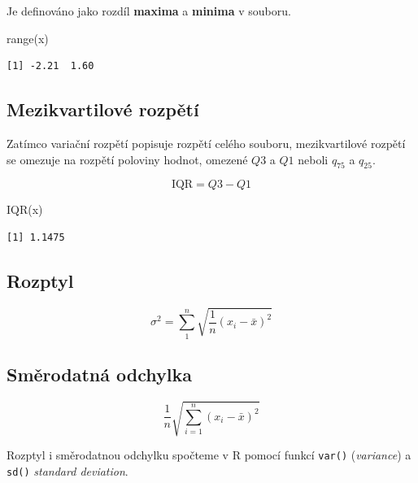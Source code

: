 \documentclass[
  letterpaper,
  DIV=11,
  numbers=noendperiod]{scrreprt}
\newenvironment{Shaded}{\begin{snugshade}}{\end{snugshade}}
\newcommand{\FunctionTok}[1]{\textcolor[rgb]{0.28,0.35,0.67}{#1}}
\newcommand{\NormalTok}[1]{\textcolor[rgb]{0.00,0.23,0.31}{#1}}
\begin{document}
Je definováno jako rozdíl \textbf{maxima} a \textbf{minima} v souboru.

\begin{Shaded}
\begin{Highlighting}[]
\FunctionTok{range}\NormalTok{(x)}
\end{Highlighting}
\end{Shaded}

\begin{verbatim}
[1] -2.21  1.60
\end{verbatim}

\hypertarget{mezikvartilovuxe9-rozpux11btuxed}{%
\subsection{Mezikvartilové
rozpětí}\label{mezikvartilovuxe9-rozpux11btuxed}}

Zatímco variační rozpětí popisuje rozpětí celého souboru, mezikvartilové
rozpětí se omezuje na rozpětí poloviny hodnot, omezené \(Q3\) a \(Q1\)
neboli \(q_{75}\) a \(q_{25}\).

\[
\mathrm{IQR} = Q3 - Q1
\]

\begin{Shaded}
\begin{Highlighting}[]
\FunctionTok{IQR}\NormalTok{(x)}
\end{Highlighting}
\end{Shaded}

\begin{verbatim}
[1] 1.1475
\end{verbatim}

\hypertarget{rozptyl}{%
\subsection{Rozptyl}\label{rozptyl}}

\[
     \sigma^2 =\sum\limits_{1}^{n}\sqrt{\dfrac{1}{n}(x_i - \bar{x})^2}
\]

\hypertarget{smux11brodatnuxe1-odchylka}{%
\subsection{Směrodatná odchylka}\label{smux11brodatnuxe1-odchylka}}

\[
   \dfrac{1}{n}\sqrt{\sum\limits_{i=1}^{n}(x_i - \bar{x})^2}
\]

Rozptyl i směrodatnou odchylku spočteme v R pomocí funkcí \texttt{var()}
(\emph{variance}) a \texttt{sd()} \emph{standard deviation}.
\end{document}
